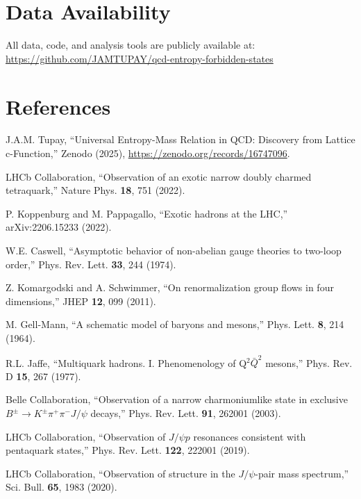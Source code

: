 \documentclass[12pt,a4paper]{article}
\begin{document}
\section*{Data Availability}

All data, code, and analysis tools are publicly available at: \url{https://github.com/JAMTUPAY/qcd-entropy-forbidden-states}

\section*{References}

\begin{thebibliography}{99}

J.A.M. Tupay,
``Universal Entropy-Mass Relation in QCD: Discovery from Lattice c-Function,''
Zenodo (2025),
\url{https://zenodo.org/records/16747096}.

LHCb Collaboration,
``Observation of an exotic narrow doubly charmed tetraquark,''
Nature Phys. \textbf{18}, 751 (2022).

P. Koppenburg and M. Pappagallo,
``Exotic hadrons at the LHC,''
arXiv:2206.15233 (2022).

W.E. Caswell,
``Asymptotic behavior of non-abelian gauge theories to two-loop order,''
Phys. Rev. Lett. \textbf{33}, 244 (1974).

Z. Komargodski and A. Schwimmer,
``On renormalization group flows in four dimensions,''
JHEP \textbf{12}, 099 (2011).

M. Gell-Mann,
``A schematic model of baryons and mesons,''
Phys. Lett. \textbf{8}, 214 (1964).

R.L. Jaffe,
``Multiquark hadrons. I. Phenomenology of Q$^2\bar{Q}^2$ mesons,''
Phys. Rev. D \textbf{15}, 267 (1977).

Belle Collaboration,
``Observation of a narrow charmoniumlike state in exclusive $B^\pm \to K^\pm \pi^+ \pi^- J/\psi$ decays,''
Phys. Rev. Lett. \textbf{91}, 262001 (2003).

LHCb Collaboration,
``Observation of $J/\psi p$ resonances consistent with pentaquark states,''
Phys. Rev. Lett. \textbf{122}, 222001 (2019).

LHCb Collaboration,
``Observation of structure in the $J/\psi$-pair mass spectrum,''
Sci. Bull. \textbf{65}, 1983 (2020).


\end{thebibliography}
\end{document}
